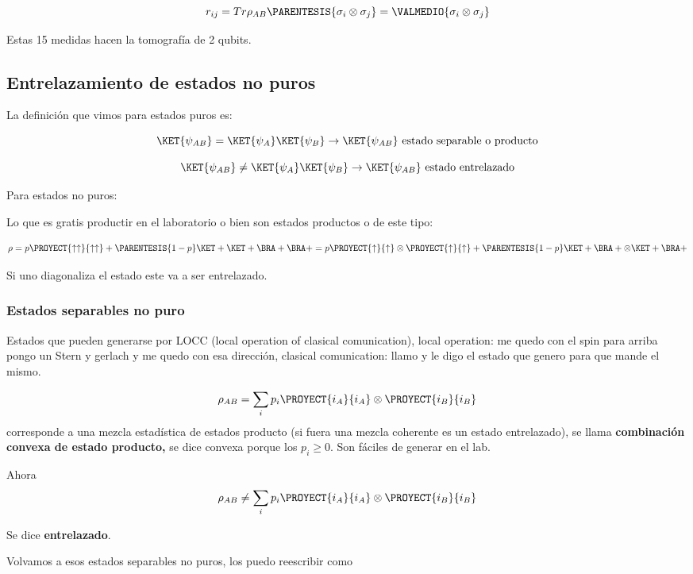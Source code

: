 \[
r_{ij}=Tr\rho_{AB}\PARENTESIS{\sigma_{i}\otimes\sigma_{j}}=\VALMEDIO{\sigma_{i}\otimes\sigma_{j}}
\]

Estas 15 medidas hacen la tomografía de 2 qubits.

\subsection{Entrelazamiento de estados no puros}

La definición que vimos para estados puros es:

\[
\KET{\psi_{AB}}=\KET{\psi_{A}}\KET{\psi_{B}}\rightarrow\KET{\psi_{AB}}\text{ estado separable o producto}
\]

\[
\KET{\psi_{AB}}\neq\KET{\psi_{A}}\KET{\psi_{B}}\rightarrow\KET{\psi_{AB}}\text{ estado entrelazado}
\]

Para estados no puros:

Lo que es gratis productir en el laboratorio o bien son estados productos
o de este tipo:

\[
\rho=p\PROYECT{\uparrow\uparrow}{\uparrow\uparrow}+\PARENTESIS{1-p}\KET +\KET +\BRA +\BRA +=p\PROYECT{\uparrow}{\uparrow}\otimes\PROYECT{\uparrow}{\uparrow}+\PARENTESIS{1-p}\KET +\BRA +\otimes\KET +\BRA +
\]

Si uno diagonaliza el estado este va a ser entrelazado. 

\subsubsection{Estados separables no puro}

Estados que pueden generarse por LOCC (local operation of clasical
comunication), local operation: me quedo con el spin para arriba pongo
un Stern y gerlach y me quedo con esa dirección, clasical comunication:
llamo y le digo el estado que genero para que mande el mismo. 

\[
\rho_{AB}=\sum_{i}p_{i}\PROYECT{i_{A}}{i_{A}}\otimes\PROYECT{i_{B}}{i_{B}}
\]
 corresponde a una mezcla estadística de estados producto (si fuera
una mezcla coherente es un estado entrelazado), se llama \textbf{combinación
convexa de estado producto, }se dice convexa porque los $p_{i}\geq0$.
Son fáciles de generar en el lab.

Ahora 
\[
\rho_{AB}\neq\sum_{i}p_{i}\PROYECT{i_{A}}{i_{A}}\otimes\PROYECT{i_{B}}{i_{B}}
\]

Se dice \textbf{entrelazado}. 

Volvamos a esos estados separables no puros, los puedo reescribir
como

